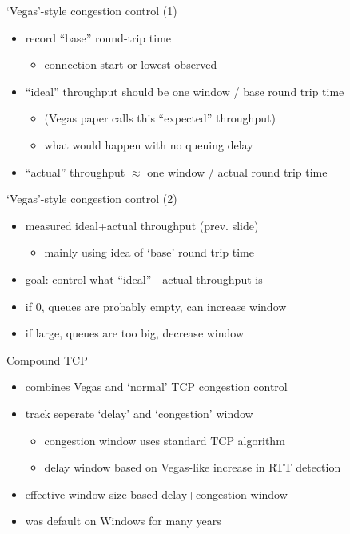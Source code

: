 \begin{frame}{`Vegas'-style congestion control (1)}
    \begin{itemize}
    \item record ``base'' round-trip time
        \begin{itemize}
        \item connection start or lowest observed
        \end{itemize}
    \item ``ideal'' throughput should be one window / base round trip time
        \begin{itemize}
        \item (Vegas paper calls this ``expected'' throughput)
        \item what would happen with no queuing delay
        \end{itemize}
    \item ``actual'' throughput $\approx$ one window / actual round trip time
    \end{itemize}
\end{frame}

\begin{frame}{`Vegas'-style congestion control (2)}
    \begin{itemize}
    \item measured ideal+actual throughput (prev. slide)
        \begin{itemize}
        \item mainly using idea of `base' round trip time
        \end{itemize}
    \vspace{.5cm}
    \item goal: control what ``ideal'' - actual throughput is
    \item if 0, queues are probably empty, can increase window
    \item if large, queues are too big, decrease window
    \end{itemize}
\end{frame}

\begin{frame}{Compound TCP}
    \begin{itemize}
    \item combines Vegas and `normal' TCP congestion control
    \item track seperate `delay' and `congestion' window
    \begin{itemize}
        \item congestion window uses standard TCP algorithm
        \item delay window based on Vegas-like increase in RTT detection
    \end{itemize}
    \item effective window size based delay+congestion window
    \vspace{.5cm}
    \item was default on Windows for many years
    \end{itemize}
\end{frame}

